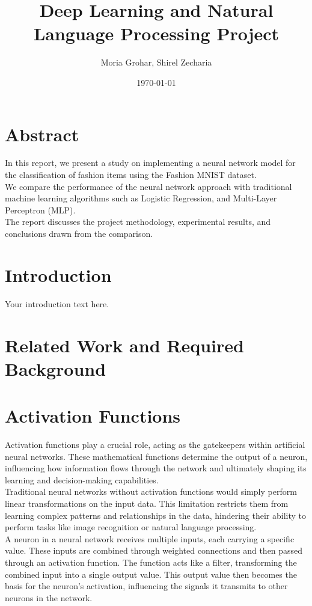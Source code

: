 \documentclass{article}
\title{Deep Learning and Natural Language Processing Project}
\author{Moria Grohar, Shirel Zecharia}
\date{\today}
\begin{document}
\maketitle

\section{Abstract}
In this report, we present a study on implementing a neural network model for the classification of fashion items using the Fashion MNIST dataset.\\
We compare the performance of the neural network approach with traditional machine learning algorithms such as Logistic Regression, and Multi-Layer Perceptron (MLP).\\
The report discusses the project methodology, experimental results, and conclusions drawn from the comparison.

\section{Introduction}
Your introduction text here.

\section{Related Work and Required Background}

\section{Activation Functions}
Activation functions play a crucial role, acting as the gatekeepers within artificial neural networks. These mathematical functions determine the output of a neuron, influencing how information flows through the network and ultimately shaping its learning and decision-making capabilities.\\
Traditional neural networks without activation functions would simply perform linear transformations on the input data. This limitation restricts them from learning complex patterns and relationships in the data, hindering their ability to perform tasks like image recognition or natural language processing.\\
A neuron in a neural network receives multiple inputs, each carrying a specific value. These inputs are combined through weighted connections and then passed through an activation function. The function acts like a filter, transforming the combined input into a single output value. This output value then becomes the basis for the neuron's activation, influencing the signals it transmits to other neurons in the network.
\end{document}
